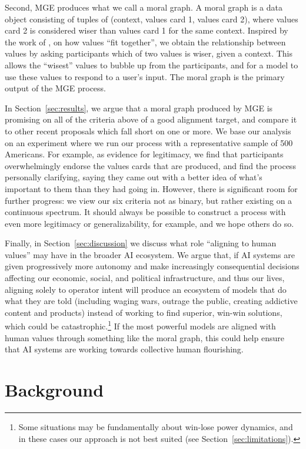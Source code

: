\documentclass{article}
\theoremstyle{definition}
\begin{document}
Second, MGE produces what we call a moral graph. A moral graph is a data object consisting of tuples of (context, values card 1, values card 2), where values card 2 is considered wiser than values card 1 for the same context. Inspired by the work of \cite{Taylor1995}, \cite{Chang2004-CHAPTM} on how values “fit together”, we obtain the relationship between values by asking participants which of two values is wiser, given a context. This allows the “wisest” values to bubble up from the participants, and for a model to use these values to respond to a user’s input. The moral graph is the primary output of the MGE process.

In Section~\ref{sec:results}, we argue that a moral graph produced by MGE is promising on all of the criteria above of a good alignment target, and compare it to other recent proposals which fall short on one or more. We base our analysis on an experiment where we run our process with a representative sample of 500 Americans. For example, as evidence for legitimacy, we find that participants overwhelmingly endorse the values cards that are produced, and find the process personally clarifying, saying they came out with a better idea of what’s important to them than they had going in. However, there is significant room for further progress: we view our six criteria not as binary, but rather existing on a continuous spectrum. It should always be possible to construct a process with even more legitimacy or generalizability, for example, and we hope others do so. 

Finally, in Section~\ref{sec:discussion} we discuss what role “aligning to human values” may have in the broader AI ecosystem. We argue that, if AI systems are given progressively more autonomy and make increasingly consequential decisions affecting our economic, social, and political infrastructure, and thus our lives, aligning solely to operator intent will produce an ecosystem of models that do what they are told (including waging wars, outrage the public, creating addictive content and products) instead of working to find superior, win-win solutions, which could be catastrophic.\footnote{Some situations may be fundamentally about win-lose power dynamics, and in these cases our approach is not best suited (see Section~\ref{sec:limitations}).}  If the most powerful models are aligned with human values through something like the moral graph, this could help ensure that AI systems are working towards collective human flourishing. 

\section{Background}\label{sec:background}
\end{document}
